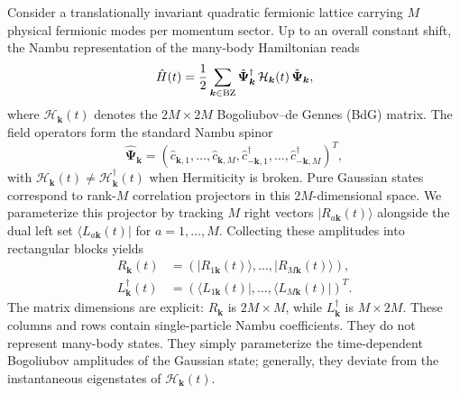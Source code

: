 \documentclass[aps,prb,reprint,superscriptaddress,amsmath,amssymb,floatfix]{revtex4-2}
\begin{document}
  Consider a translationally invariant quadratic fermionic lattice carrying $M$ physical fermionic modes per momentum sector. Up to an overall constant shift, the Nambu representation of the many-body Hamiltonian reads
\begin{equation}
\hat H(t) =\frac{1}{2} \sum_{\bm k\in{\rm BZ}} \hat{\bm\Psi}_{\bm k}^{\dagger} \,\mathcal H_{\bm k}(t)\, \hat{\bm\Psi}_{\bm k},
\label{eq:general_BdG_H}
\end{equation}
where ${\mathcal H}_{\bm k}(t)$ denotes the $2M\times2M$ Bogoliubov--de Gennes (BdG) matrix. The field operators form the standard Nambu spinor
\begin{equation}
\hat{\bm\Psi}_{\bm k} = \left( \hat c_{\bm k,1}, \ldots, \hat c_{\bm k,M}, \hat c_{-\bm k,1}^{\dagger}, \ldots, \hat c_{-\bm k,M}^{\dagger} \right)^T ,
\label{eq:general_nambu_spinor}
\end{equation}
with $\mathcal H_{\bm k}(t)\neq\mathcal H_{\bm k}^{\dagger}(t)$ when Hermiticity is broken. Pure Gaussian states correspond to rank-$M$ correlation projectors in this $2M$-dimensional space. We parameterize this projector by tracking $M$ right vectors $\vert{}R_{a\bm k}(t)\rangle$ alongside the dual left set $\langle L_{a\bm k}(t)\vert{}$ for $a=1,\ldots,M$. Collecting these amplitudes into rectangular blocks yields
\begin{equation}
\begin{aligned}
R_{\bm k}(t) &= \left( |R_{1\bm k}(t)\rangle,\ldots, |R_{M\bm k}(t)\rangle \right), \\ L_{\bm k}^{\dagger}(t) &= \left( \langle L_{1\bm k}(t)|,\ldots, \langle L_{M\bm k}(t)| \right)^{T}.
\end{aligned}
\label{eq:general_LR_frames}
\end{equation}
The matrix dimensions are explicit: $R_{\bm k}$ is $2M\times M$, while $L_{\bm k}^{\dagger}$ is $M\times2M$. These columns and rows contain single-particle Nambu coefficients. They do not represent many-body states. They simply parameterize the time-dependent Bogoliubov amplitudes of the Gaussian state; generally, they deviate from the instantaneous eigenstates of $\mathcal H_{\bm k}(t)$.
\end{document}
